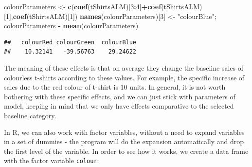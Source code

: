 \documentclass[
]{book}
\newenvironment{Shaded}{\begin{snugshade}}{\end{snugshade}}
\newcommand{\DecValTok}[1]{\textcolor[rgb]{0.00,0.00,0.81}{#1}}
\newcommand{\FunctionTok}[1]{\textcolor[rgb]{0.13,0.29,0.53}{\textbf{#1}}}
\newcommand{\NormalTok}[1]{#1}
\newcommand{\OtherTok}[1]{\textcolor[rgb]{0.56,0.35,0.01}{#1}}
\newcommand{\SpecialCharTok}[1]{\textcolor[rgb]{0.81,0.36,0.00}{\textbf{#1}}}
\newcommand{\StringTok}[1]{\textcolor[rgb]{0.31,0.60,0.02}{#1}}
\theoremstyle{definition}
\theoremstyle{definition}
\theoremstyle{definition}
\theoremstyle{definition}
\theoremstyle{remark}
\begin{document}
\begin{Shaded}
\begin{Highlighting}[]
\NormalTok{colourParameters }\OtherTok{\textless{}{-}} \FunctionTok{c}\NormalTok{(}\FunctionTok{coef}\NormalTok{(tShirtsALM)[}\DecValTok{3}\SpecialCharTok{:}\DecValTok{4}\NormalTok{]}\SpecialCharTok{+}\FunctionTok{coef}\NormalTok{(tShirtsALM)[}\DecValTok{1}\NormalTok{],}\FunctionTok{coef}\NormalTok{(tShirtsALM)[}\DecValTok{1}\NormalTok{])}
\FunctionTok{names}\NormalTok{(colourParameters)[}\DecValTok{3}\NormalTok{] }\OtherTok{\textless{}{-}} \StringTok{"colourBlue"}\NormalTok{;}
\NormalTok{colourParameters }\SpecialCharTok{{-}} \FunctionTok{mean}\NormalTok{(colourParameters)}
\end{Highlighting}
\end{Shaded}

\begin{verbatim}
##   colourRed colourGreen  colourBlue 
##    10.32141   -39.56763    29.24622
\end{verbatim}

The meaning of these effects is that on average they change the baseline sales of colourless t-shirts according to these values. For example, the specific increase of sales due to the red colour of t-shirt is 10 units. In general, it is not worth bothering with these specific effects, and we can just stick with parameters of model, keeping in mind that we only have effects comparative to the selected baseline category.

In R, we can also work with factor variables, without a need to expand variables in a set of dummies - the program will do the expansion automatically and drop the first level of the variable. In order to see how it works, we create a data frame with the factor variable \texttt{colour}:

\begin{Shaded}
\end{Shaded}
\end{document}
